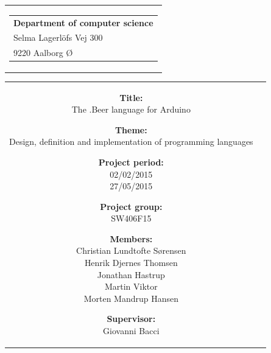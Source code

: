
\thispagestyle{empty}

{\samepage 
\begin{tabular}{r}
	\parbox{\textwidth}{  
	\hfill \parbox{7cm}{\begin{tabular}{l} %
		{\small \textbf{Department of computer science}}\\
		{\small Selma Lagerlöfs Vej 300} \\
		{\small 9220 Aalborg Ø}
	\end{tabular}}
	}
\end{tabular}

\begin{tabular}{cc}
	\parbox{8cm}{
	\begin{description}
		\item { \textbf{Title:}}\\ 
			The .Beer language for Arduino
    		\item { \textbf{Theme:}}\\ 
			Design, definition and implementation of programming languages\\
	\end{description}
	
	\parbox{8cm}{
	\begin{description}
		\item { \textbf{Project period:}}\\
			02/02/2015\\
			27/05/2015\\
 		\hspace{4cm}
		\item { \textbf{Project group:}}\\
  			SW406F15\\
 		\hspace{4cm}
		\item {\textbf{Members:}}\\
            Christian Lundtofte Sørensen\\
            Henrik Djernes Thomsen\\
            Jonathan Hastrup\\
            Martin Viktor\\
            Morten Mandrup Hansen\\
		\hspace{2cm}
		\item { \textbf{Supervisor:}}\\
 			Giovanni Bacci\\
  	\end{description} 
	}

}
\end{tabular}}
